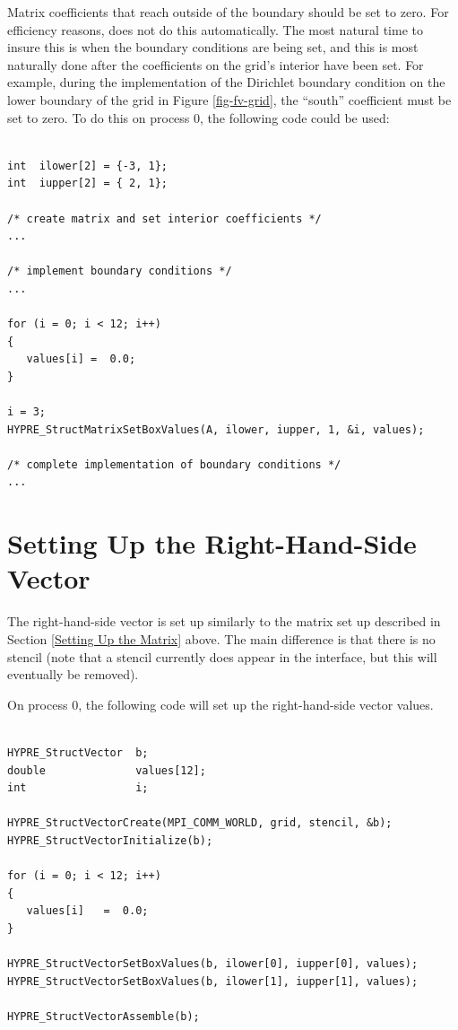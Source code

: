 Matrix coefficients that reach outside of the boundary should be set
to zero.  For efficiency reasons, \hypre{} does not do this
automatically.  The most natural time to insure this is when the
boundary conditions are being set, and this is most naturally done
after the coefficients on the grid's interior have been set.  For
example, during the implementation of the Dirichlet boundary condition
on the lower boundary of the grid in Figure \ref{fig-fv-grid}, the
``south'' coefficient must be set to zero.  To do this on process 0,
the following code could be used:
\begin{display}
\begin{verbatim}

int  ilower[2] = {-3, 1};
int  iupper[2] = { 2, 1};

/* create matrix and set interior coefficients */
...

/* implement boundary conditions */
...

for (i = 0; i < 12; i++)
{
   values[i] =  0.0;
}

i = 3;
HYPRE_StructMatrixSetBoxValues(A, ilower, iupper, 1, &i, values);

/* complete implementation of boundary conditions */
...

\end{verbatim}
\end{display}


\section{Setting Up the Right-Hand-Side Vector}
\label{Setting Up the Right-Hand-Side Vector}

The right-hand-side vector is set up similarly to the matrix set up
described in Section \ref{Setting Up the Matrix} above.  The main
difference is that there is no stencil (note that a stencil currently
does appear in the interface, but this will eventually be removed).

On process 0, the following code will set up the right-hand-side
vector values.
\begin{display}
\begin{verbatim}

HYPRE_StructVector  b;
double              values[12];
int                 i;

HYPRE_StructVectorCreate(MPI_COMM_WORLD, grid, stencil, &b);
HYPRE_StructVectorInitialize(b);

for (i = 0; i < 12; i++)
{
   values[i]   =  0.0;
}

HYPRE_StructVectorSetBoxValues(b, ilower[0], iupper[0], values);
HYPRE_StructVectorSetBoxValues(b, ilower[1], iupper[1], values);

HYPRE_StructVectorAssemble(b);

\end{verbatim}
\end{display}

